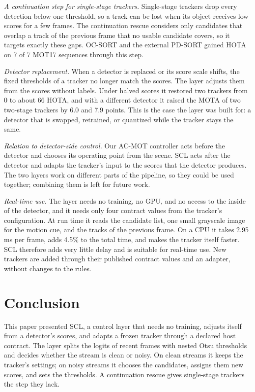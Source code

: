 \documentclass[pdflatex,referee,sn-mathphys-num]{sn-jnl}
\newcommand{\scl}{SCL}
\begin{document}
\emph{A continuation step for single-stage trackers.} Single-stage trackers
drop every detection below one threshold, so a track can be lost when its
object receives low scores for a few frames. The continuation rescue
considers only candidates that overlap a track of the previous frame that no
usable candidate covers, so it targets exactly these gaps. OC-SORT and the
external PD-SORT gained HOTA on 7 of 7 MOT17 sequences through this step.

\emph{Detector replacement.} When a detector is replaced or its score scale
shifts, the fixed thresholds of a tracker no longer match the scores. The
layer adjusts them from the scores without labels. Under halved scores it
restored two trackers from 0 to about 66 HOTA, and with a different detector
it raised the MOTA of two two-stage trackers by 6.0 and 7.9 points. This is
the case the layer was built for: a detector that is swapped, retrained, or
quantized while the tracker stays the same.

\emph{Relation to detector-side control.} Our AC-MOT controller acts
before the detector and chooses its operating point from the scene. \scl{}
acts after the detector and adapts the tracker's input to the scores that the
detector produces. The two layers work on different parts of the pipeline,
so they could be used together; combining them is left for future work.

\emph{Real-time use.} The layer needs no training, no GPU, and no access to
the inside of the detector, and it needs only four contract values from the
tracker's configuration. At run time it reads the candidate list, one small
grayscale image for the motion cue, and the tracks of the previous frame. On
a CPU it takes 2.95 ms per frame, adds 4.5\% to the total time, and makes the
tracker itself faster. \scl{} therefore adds very little delay and is
suitable for real-time use. New trackers are added through their published
contract values and an adapter, without changes to the rules.
\section{Conclusion}\label{sec:conclusion}

This paper presented \scl{}, a control layer that needs no training, adjusts
itself from a detector's scores, and adapts a frozen tracker through a
declared host contract. The layer splits the logits of recent frames with
nested Otsu thresholds and decides whether the stream is clean or noisy. On
clean streams it keeps the tracker's settings; on noisy streams it chooses
the candidates, assigns them new scores, and sets the thresholds. A
continuation rescue gives single-stage trackers the step they lack.
\end{document}
